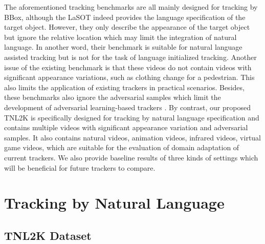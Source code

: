 \documentclass[final]{cvpr}
\begin{document}
The aforementioned tracking benchmarks are all mainly designed for tracking by BBox, although the LaSOT indeed provides the language specification of the target object. However, they only describe the appearance of the target object but ignore the relative location which may limit the integration of natural language. In another word, their benchmark is suitable for natural language assisted tracking but is not for the task of language initialized tracking. Another issue of the existing benchmark is that these videos do not contain videos with significant appearance variations, such as clothing change for a pedestrian. This also limits the application of existing trackers in practical scenarios. Besides, these benchmarks also ignore the adversarial samples which limit the development of adversarial learning-based trackers \cite{wiyatno2019TrackAttack, jia2020TrackAttack, liang2020TrackAttack, yan2020TrackAttack}. By contrast, our proposed TNL2K is specifically designed for tracking by natural language specification and contains multiple videos with significant appearance variation and adversarial samples. It also contains natural videos, animation videos, infrared videos, virtual game videos, which are suitable for the evaluation of domain adaptation of current trackers. We also provide baseline results of three kinds of settings which will be beneficial for future trackers to compare. 






















\section{Tracking by Natural Language} 




\subsection{TNL2K Dataset} 
\end{document}

